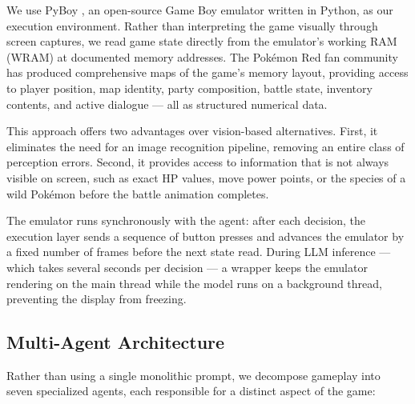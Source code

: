 \documentclass{article}
\begin{document}
We use PyBoy \citep{pyboy}, an open-source Game Boy emulator written in Python, as our execution environment. Rather than interpreting the game visually through screen captures, we read game state directly from the emulator's working RAM (WRAM) at documented memory addresses. The Pok\'{e}mon Red fan community has produced comprehensive maps of the game's memory layout, providing access to player position, map identity, party composition, battle state, inventory contents, and active dialogue --- all as structured numerical data.

This approach offers two advantages over vision-based alternatives. First, it eliminates the need for an image recognition pipeline, removing an entire class of perception errors. Second, it provides access to information that is not always visible on screen, such as exact HP values, move power points, or the species of a wild Pok\'{e}mon before the battle animation completes.

The emulator runs synchronously with the agent: after each decision, the execution layer sends a sequence of button presses and advances the emulator by a fixed number of frames before the next state read. During LLM inference --- which takes several seconds per decision --- a wrapper keeps the emulator rendering on the main thread while the model runs on a background thread, preventing the display from freezing.

\subsection{Multi-Agent Architecture}

Rather than using a single monolithic prompt, we decompose gameplay into seven specialized agents, each responsible for a distinct aspect of the game:
\end{document}
